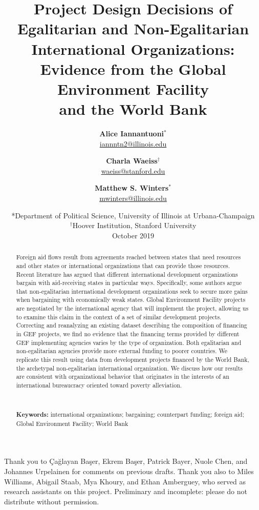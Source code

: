 \documentclass{article}
\title{\textbf{Project Design Decisions of Egalitarian and Non-Egalitarian International Organizations: \\ Evidence from the Global Environment Facility \\ and the World Bank} \\[2ex]}
\author{\textbf{Alice Iannantuoni}$^*$ \\ \href{mailto:iannntn2@illinois.edu}{iannntn2@illinois.edu} \and \textbf{Charla Waeiss}$^\dagger$ \\ \href{mailto:waeiss@stanford.edu}{waeiss@stanford.edu} \and \textbf{Matthew S. Winters}$^*$ \\ \href{mailto:mwinters@illinois.edu}{mwinters@illinois.edu}}
\date{%
	*Department of Political Science, University of Illinois at Urbana-Champaign\\
	$^\dagger$Hoover Institution, Stanford University\\[4ex]%
	October 2019
}
\begin{document}
	
	\maketitle
	
	\begin{abstract} Foreign aid flows result from agreements reached between states that need resources and other states or international organizations that can provide those resources.  Recent literature has argued that different international development organizations bargain with aid-receiving states in particular ways.  Specifically, some authors argue that non-egalitarian international development organizations seek to secure more gains when bargaining with economically weak states.  Global Environment Facility projects are negotiated by the international agency that will implement the project, allowing us to examine this claim in the context of a set of similar development projects.  Correcting and reanalyzing an existing dataset describing the composition of financing in GEF projects, we find no evidence that the financing terms provided by different GEF implementing agencies varies by the type of organization.  Both egalitarian and non-egalitarian agencies provide more external funding to poorer countries.  We replicate this result using data from development projects financed by the World Bank, the archetypal non-egalitarian international organization.  We discuss how our results are consistent with organizational behavior that originates in the interests of an international bureaucracy oriented toward poverty alleviation.
	
	\
	
	\noindent \textbf{Keywords:} international organizations; bargaining; counterpart funding; foreign aid; Global Environment Facility; World Bank
	
	\end{abstract}
	
	
	\vfill \noindent Thank you to Çağlayan Başer, Ekrem Başer, Patrick Bayer, Nuole Chen, and Johannes Urpelainen for comments on previous drafts.  Thank you also to Miles Williams, Abigail Staab, Mya Khoury, and Ethan Amberguey, who served as research assistants on this project. Preliminary and incomplete: please do not distribute without permission.

	
	
\newpage
\doublespacing 
\end{document}
